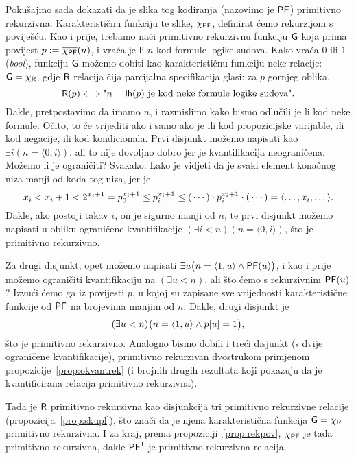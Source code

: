 \begin{primjer}
Pokušajmo sada dokazati da je slika tog kodiranja (nazovimo je $\mathsf{PF}$) primitivno rekurzivna. Karakterističnu funkciju te slike, $\chi_{\mathsf{PF}}$, definirat ćemo rekurzijom s poviješću. Kao i prije, trebamo naći primitivno rekurzivnu funkciju $\mathsf G$ koja prima povijest $p:=\overline{\chi_{\mathsf{PF}}}(n)$, i vraća je li $n$ kod formule logike sudova. Kako vraća $0$ ili $1$ (\emph{bool}), funkciju $\mathsf G$ možemo dobiti kao karakterističnu funkciju neke relacije: $\mathsf G=\chi_{\mathsf R}$, gdje $\mathsf R$ relacija čija parcijalna specifikacija glasi: za $p$ gornjeg oblika,
\begin{equation}
    \mathsf R(p)\Longleftrightarrow\text{"$n=\mathsf{lh}(p)$ je kod neke formule logike sudova".}
\end{equation}
Dakle, pretpostavimo da imamo $n$, i razmislimo kako bismo odlučili je li kod neke formule. Očito, to će vrijediti ako i samo ako je ili kod propozicijske varijable, ili kod negacije, ili kod kondicionala. Prvi disjunkt možemo napisati kao $\exists i(n=\langle0,i\rangle)$, ali to nije dovoljno dobro jer je kvantifikacija neograničena. Možemo li je ograničiti? Svakako. Lako je vidjeti da je svaki element konačnog niza manji od koda tog niza, jer je
\begin{equation}\label{eq:elem<kod}
    x_i<x_i+1<2^{x_i+1}=p_0^{x_i+1}\le p_i^{x_i+1}\le(\,\dotsm)\cdot p_i^{x_i+1}\cdot(\,\dotsm)=\langle\dotsc,x_i,\dotsc\rangle\text.
\end{equation}
Dakle, ako postoji takav $i$, on je sigurno manji od $n$, te prvi disjunkt možemo napisati u obliku ograničene kvantifikacije $(\exists i<n)(n=\langle0,i\rangle)$, što je primitivno rekurzivno.

Za drugi disjunkt, opet možemo napisati $\exists u\bigl(n=\langle1,u\rangle\land\mathsf{PF}(u)\bigr)$, i kao i prije možemo ograničiti kvantifikaciju na $(\exists u<n)$, ali što ćemo s rekurzivnim $\mathsf{PF}(u)$? Izvući ćemo ga iz povijesti $p$, u kojoj su zapisane sve vrijednosti karakteristične funkcije od $\mathsf{PF}$ na brojevima manjim od $n$. Dakle, drugi disjunkt je
\begin{equation}
    (\exists u<n)\bigl(n=\langle1,u\rangle\land p[u]=1\bigr)\text,
\end{equation}
što je primitivno rekurzivno. Analogno bismo dobili i treći disjunkt (s dvije ograničene kvantifikacije),  primitivno rekurzivan dvostrukom primjenom propozicije~\ref{prop:okvantrek} (i brojnih drugih rezultata koji pokazuju da je kvantificirana relacija primitivno rekurzivna).

Tada je $\mathsf R$ primitivno rekurzivna kao disjunkcija tri primitivno rekurzivne relacije (propozicija~\ref{prop:skupl}), što znači da je njena karakteristična funkcija $\mathsf G=\chi_{\mathsf R}$ primitivno rekurzivna. I za kraj, prema propoziciji~\ref{prop:rekpov}, $\chi_{\mathsf{PF}}$ je tada primitivno rekurzivna, dakle $\mathsf{PF}^1$ je primitivno rekurzivna relacija.
\end{primjer}

